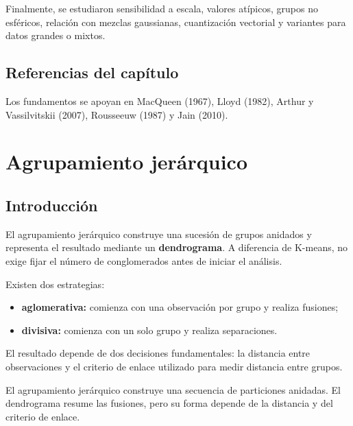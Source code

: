 \documentclass[
  spanish,
  10.5pt,
  letterpaper,
  DIV=11,
  numbers=noendperiod,
  oneside,
  open=any]{scrreprt}
\providecommand{\tightlist}{%
  \setlength{\itemsep}{0pt}\setlength{\parskip}{0pt}}
\theoremstyle{definition}
\theoremstyle{definition}
\theoremstyle{plain}
\theoremstyle{remark}
\begin{document}
Finalmente, se estudiaron sensibilidad a escala, valores atípicos,
grupos no esféricos, relación con mezclas gaussianas, cuantización
vectorial y variantes para datos grandes o mixtos.

\section*{Referencias del
capítulo}\label{referencias-del-capuxedtulo-17}


Los fundamentos se apoyan en MacQueen (1967), Lloyd (1982), Arthur y
Vassilvitskii (2007), Rousseeuw (1987) y Jain (2010).

\chapter{\texorpdfstring{Agrupamiento
jerárquico}{Agrupamiento jerárquico}}\label{sec-agrupamiento-jerarquico}

\section*{Introducción}\label{introducciuxf3n-19}


El agrupamiento jerárquico construye una sucesión de grupos anidados y
representa el resultado mediante un
\textbf{dendrograma}. A diferencia de K-means, no
exige fijar el número de conglomerados antes de iniciar el análisis.

Existen dos estrategias:

\begin{itemize}
\tightlist
\item
  \textbf{aglomerativa:} comienza con una observación por grupo y
  realiza fusiones;
\item
  \textbf{divisiva:} comienza con un solo grupo y realiza separaciones.
\end{itemize}

El resultado depende de dos decisiones fundamentales: la distancia entre
observaciones y el criterio de enlace utilizado para medir distancia
entre grupos.

\begin{tcolorbox}[enhanced jigsaw, arc=.35mm, bottomrule=.15mm, bottomtitle=1mm, breakable, colback=white, colbacktitle=quarto-callout-important-color!10!white, colframe=quarto-callout-important-color-frame, coltitle=black, left=2mm, leftrule=.75mm, opacityback=0, opacitybacktitle=0.6, rightrule=.15mm, title=\textcolor{quarto-callout-important-color}{\faExclamation}\hspace{0.5em}{Definición esencial}, titlerule=0mm, toprule=.15mm, toptitle=1mm]

El agrupamiento jerárquico construye una secuencia de particiones
anidadas. El dendrograma resume las fusiones, pero su forma depende de
la distancia y del criterio de enlace.

\end{tcolorbox}
\end{document}
